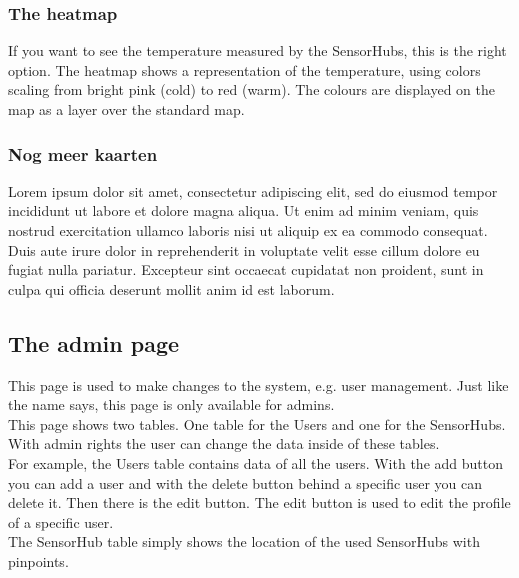 \documentclass[a4paper]{article}
\begin{document}
\pagebreak

\subsubsection{The heatmap}
If you want to see the temperature measured by the SensorHubs, this is the right option.
The heatmap shows a representation of the temperature, using colors scaling from bright pink (cold) to red (warm). The colours are displayed on the map as a layer over the standard map.
~\\

\subsubsection{Nog meer kaarten}
Lorem ipsum dolor sit amet, consectetur adipiscing elit, sed do eiusmod tempor incididunt ut labore et dolore magna aliqua. Ut enim ad minim veniam, quis nostrud exercitation ullamco laboris nisi ut aliquip ex ea commodo consequat. Duis aute irure dolor in reprehenderit in voluptate velit esse cillum dolore eu fugiat nulla pariatur. Excepteur sint occaecat cupidatat non proident, sunt in culpa qui officia deserunt mollit anim id est laborum.

\pagebreak

\subsection{The admin page}
This page is used to make changes to the system, e.g. user management. Just like the name says, this page is only available for admins.
\\
This page shows two tables. One table for the Users and one for the SensorHubs. With admin rights the user can change the data inside of these tables.
\\
For example, the Users table contains data of all the users. With the add button you can add a user and with the delete button behind a specific user you can delete it. Then there is the edit button. The edit button is used to edit the profile of a specific user.
\\
The SensorHub table simply shows the location of the used SensorHubs with pinpoints.
\end{document}
